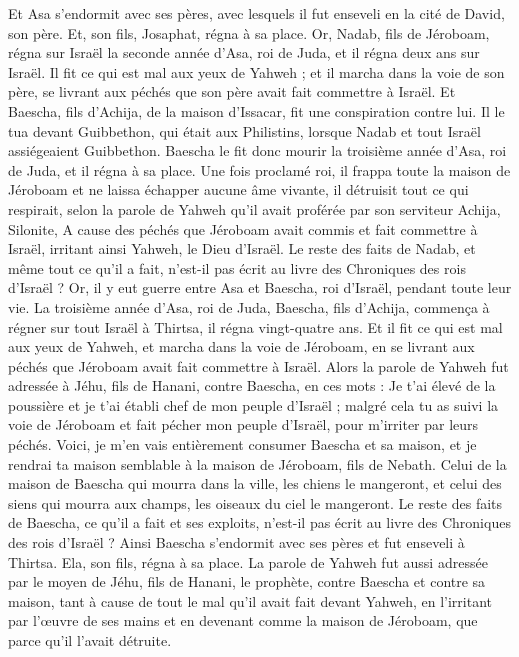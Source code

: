 \begin{multicols}{2}
Et Asa s'endormit avec ses pères, avec lesquels il fut enseveli en la cité de David, son père. Et, son fils, Josaphat, régna à sa place.
Or, Nadab, fils de Jéroboam, régna sur Israël la seconde année d'Asa, roi de Juda, et il régna deux ans sur Israël.
Il fit ce qui est mal aux yeux de Yahweh ; et il marcha dans la voie de son père, se livrant aux péchés que son père avait fait commettre à Israël.
Et Baescha, fils d'Achija, de la maison d'Issacar, fit une conspiration contre lui. Il le tua devant Guibbethon, qui était aux Philistins, lorsque Nadab et tout Israël assiégeaient Guibbethon.
Baescha le fit donc mourir la troisième année d'Asa, roi de Juda, et il régna à sa place.
Une fois proclamé roi, il frappa toute la maison de Jéroboam et ne laissa échapper aucune âme vivante, il détruisit tout ce qui respirait, selon la parole de Yahweh qu'il avait proférée par son serviteur Achija, Silonite,
A cause des péchés que Jéroboam avait commis et fait commettre à Israël, irritant ainsi Yahweh, le Dieu d'Israël.
Le reste des faits de Nadab, et même tout ce qu'il a fait, n'est-il pas écrit au livre des Chroniques des rois d'Israël ?
Or, il y eut guerre entre Asa et Baescha, roi d'Israël, pendant toute leur vie.
La troisième année d'Asa, roi de Juda, Baescha, fils d'Achija, commença à régner sur tout Israël à Thirtsa, il régna vingt-quatre ans.
Et il fit ce qui est mal aux yeux de Yahweh, et marcha dans la voie de Jéroboam, en se livrant aux péchés que Jéroboam avait fait commettre à Israël.
\VerseOne{}Alors la parole de Yahweh fut adressée à Jéhu, fils de Hanani, contre Baescha, en ces mots :
Je t'ai élevé de la poussière et je t'ai établi chef de mon peuple d'Israël ; malgré cela tu as suivi la voie de Jéroboam et fait pécher mon peuple d'Israël, pour m'irriter par leurs péchés.
Voici, je m'en vais entièrement consumer Baescha et sa maison, et je rendrai ta maison semblable à la maison de Jéroboam, fils de Nebath.
Celui de la maison de Baescha qui mourra dans la ville, les chiens le mangeront, et celui des siens qui mourra aux champs, les oiseaux du ciel le mangeront.
Le reste des faits de Baescha, ce qu'il a fait et ses exploits, n'est-il pas écrit au livre des Chroniques des rois d'Israël ?
Ainsi Baescha s'endormit avec ses pères et fut enseveli à Thirtsa. Ela, son fils, régna à sa place.
La parole de Yahweh fut aussi adressée par le moyen de Jéhu, fils de Hanani, le prophète, contre Baescha et contre sa maison, tant à cause de tout le mal qu'il avait fait devant Yahweh, en l'irritant par l'œuvre de ses mains et en devenant comme la maison de Jéroboam, que parce qu'il l'avait détruite.

\end{multicols}
